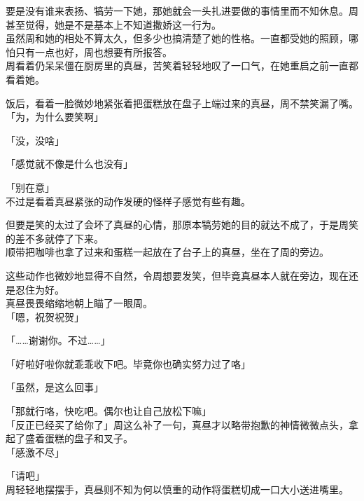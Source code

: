 要是没有谁来表扬、犒劳一下她，那她就会一头扎进要做的事情里而不知休息。周甚至觉得，她是不是基本上不知道撒娇这一行为。\\

虽然周和她的相处不算太久，但多少也搞清楚了她的性格。一直都受她的照顾，哪怕只有一点也好，周也想要有所报答。\\

周看着仍呆呆僵在厨房里的真昼，苦笑着轻轻地叹了一口气，在她重启之前一直都看着她。\\

\vspace{2\baselineskip}

饭后，看着一脸微妙地紧张着把蛋糕放在盘子上端过来的真昼，周不禁笑漏了嘴。\\

「为，为什么要笑啊」

「没，没啥」

「感觉就不像是什么也没有」

「别在意」\\

不过是看着真昼紧张的动作发硬的怪样子感觉有些有趣。

但要是笑的太过了会坏了真昼的心情，那原本犒劳她的目的就达不成了，于是周笑的差不多就停了下来。\\

顺带把咖啡也拿了过来和蛋糕一起放在了台子上的真昼，坐在了周的旁边。

这些动作也微妙地显得不自然，令周想要发笑，但毕竟真昼本人就在旁边，现在还是忍住为好。\\

真昼畏畏缩缩地朝上瞄了一眼周。\\

「嗯，祝贺祝贺」

「……谢谢你。不过……」

「好啦好啦你就乖乖收下吧。毕竟你也确实努力过了咯」

「虽然，是这么回事」

「那就行咯，快吃吧。偶尔也让自己放松下嘛」\\

「反正已经买了给你了」周这么补了一句，真昼才以略带抱歉的神情微微点头，拿起了盛着蛋糕的盘子和叉子。\\

「感激不尽」

「请吧」\\

周轻轻地摆摆手，真昼则不知为何以慎重的动作将蛋糕切成一口大小送进嘴里。\\

